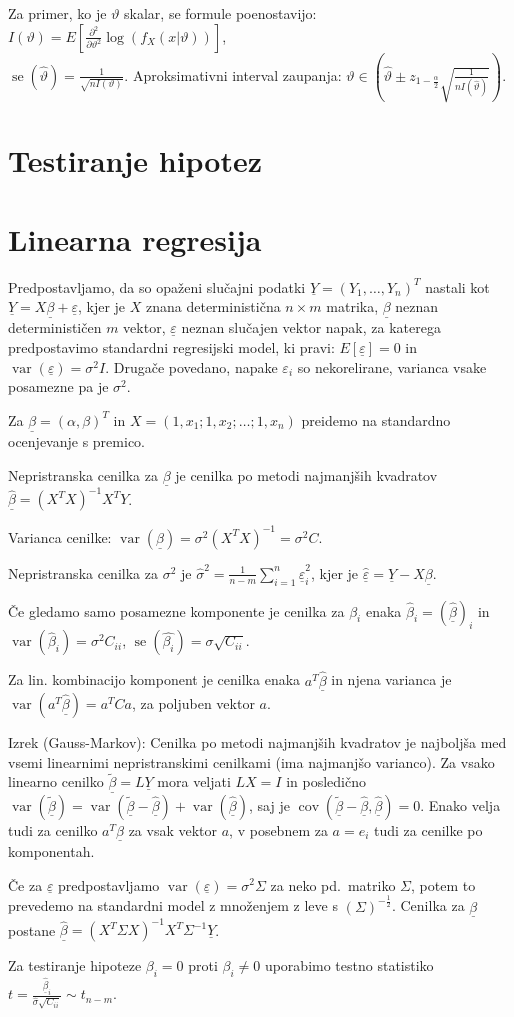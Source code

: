 \documentclass[11pt,a4paper]{amsart}
\theoremstyle{definition} %
\theoremstyle{plain} %
\newcommand{\Y}{\underline{Y}}
\newcommand{\ubeta}{\ensuremath{\underline{\beta}}}
\newcommand{\ueps}{\ensuremath{\underline{\varepsilon}}}
\DeclareMathOperator{\cov}{cov}
\DeclareMathOperator{\var}{var}
\DeclareMathOperator{\se}{se}
\begin{document}
Za primer, ko je $\vartheta$ skalar, se formule poenostavijo:
$I(\vartheta) = E[\frac{\partial^2}{\partial\vartheta^2}
\log(f_X(x|\vartheta))]$, \\
$\se(\hat{\vartheta}) = \frac{1}{\sqrt{n I(\vartheta)}}$.
Aproksimativni interval zaupanja: $\vartheta \in \left( \hat{\vartheta} \pm z_{1-\frac{\alpha}{2}}
\sqrt{\frac{1}{nI(\hat{\vartheta})}}\right)$.

\section*{Testiranje hipotez}

\section*{Linearna regresija}
Predpostavljamo, da so opaženi slučajni podatki $\Y = (Y_1, \dots, Y_n)^T$ nastali kot
$\Y = X \ubeta + \ueps$, kjer je $X$ znana deterministična $n \times m$ matrika, $\ubeta$
neznan determinističen $m$ vektor, $\ueps$ neznan slučajen vektor napak, za katerega
predpostavimo standardni regresijski model, ki pravi: $E[\ueps] = 0$ in
$\var(\ueps) = \sigma^2 I$.  Drugače povedano, napake $\varepsilon_i$ so
nekorelirane, varianca vsake posamezne pa je $\sigma^2$.

Za $\ubeta = (\alpha, \beta)^T$ in $X = (1, x_1; 1, x_2; \dots; 1, x_n)$
preidemo na standardno ocenjevanje s premico.

Nepristranska cenilka za $\ubeta$ je cenilka po metodi najmanjših kvadratov
$\hat{\ubeta} = (X^TX)^{-1}X^TY$.

Varianca cenilke: $\var(\ubeta) = \sigma^2(X^TX)^{-1} = \sigma^2C$.

Nepristranska cenilka za $\sigma^2$ je $\hat{\sigma}^2 = \frac{1}{n-m}
\sum_{i=1}^n \hat{\ueps}_i^2$, kjer je $\hat{\ueps} = \Y - X\ubeta$.

Če gledamo samo posamezne komponente je cenilka za $\beta_i$ enaka
$\hat{\beta}_i = (\hat{\ubeta})_i$ in $\var(\hat{\beta}_i) = \sigma^2C_{ii}$,
$\se(\hat{\beta_i}) = \sigma \sqrt{C_{ii}}$.

Za lin. kombinacijo komponent je cenilka enaka $a^T\hat{\ubeta}$ in njena
varianca je $\var(a^T\hat{\ubeta}) = a^T C a$, za poljuben vektor $a$.

Izrek (Gauss-Markov): Cenilka po metodi najmanjših kvadratov je najboljša med
vsemi linearnimi nepristranskimi cenilkami (ima najmanjšo varianco). Za vsako
linearno cenilko $\tilde{\ubeta} = L\Y$ mora veljati $LX = I$ in posledično
$\var(\tilde{\ubeta}) = \var(\tilde{\ubeta} - \hat{\ubeta}) +
\var(\hat{\ubeta})$, saj je $\cov(\tilde{\ubeta} - \hat{\ubeta}, \hat{\ubeta}) =
0$. Enako velja tudi za cenilko $a^T\hat{\ubeta}$ za vsak vektor $a$, v posebnem
za $a = e_i$ tudi za cenilke po komponentah.

Če za $\ueps$ predpostavljamo $\var(\ueps) = \sigma^2\Sigma$ za neko pd.\
matriko $\Sigma$, potem to prevedemo na standardni model z množenjem z leve s
$(\Sigma)^{-\frac12}$. Cenilka za $\ubeta$ postane $\hat{\ubeta} =
(X^T\Sigma X)^{-1}X^T\Sigma^{-1} \Y$.

Za testiranje hipoteze $\beta_i = 0$ proti $\beta_i \neq 0$ uporabimo testno
statistiko $t = \frac{\hat{\ubeta}_i}{\hat{\sigma} \sqrt{C_{ii}}} \sim t_{n-m}$.
\end{document}
